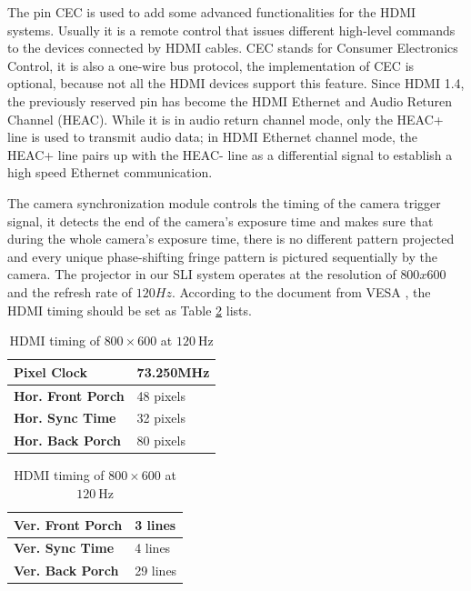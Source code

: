 \documentclass[]{spie}  %
\begin{document}
The pin CEC is used to add some advanced functionalities for the HDMI systems. Usually it is a remote control that issues different high-level commands to the devices connected by HDMI cables. CEC stands for Consumer Electronics Control, it is also a one-wire bus protocol, the implementation of CEC is optional, because not all the HDMI devices support this feature. Since HDMI 1.4, the previously reserved pin has become the HDMI Ethernet and Audio Returen Channel (HEAC). While it is in audio return channel mode, only the HEAC+ line is used to transmit audio data; in HDMI Ethernet channel mode, the HEAC+ line pairs up with the HEAC- line as a differential signal to establish a high speed Ethernet communication.

The camera synchronization module controls the timing of the camera trigger signal, it detects the end of the camera's exposure time and makes sure that during the whole camera's exposure time, there is no different pattern projected and every unique phase-shifting fringe pattern is pictured sequentially by the camera. The projector in our SLI system operates at the resolution of $800x600$ and the refresh rate of $120 Hz$. According to the document from VESA \cite{vesa07}, the HDMI timing should be set as Table \ref{Tab:2} lists.

\begin{table}[!b]
\caption{HDMI timing of $800\times 600$ at $120~\mbox{Hz}$}
\label{Tab:2}
\parbox{.45\linewidth}{
\centering
\begin{tabular}{|l|l|}
\hline
\textbf{Pixel Clock} & 73.250MHz \\ \hline
\textbf{Hor. Front Porch} & 48 pixels \\ \hline
\textbf{Hor. Sync Time} & 32 pixels \\ \hline
\textbf{Hor. Back Porch} & 80 pixels \\ \hline
\end{tabular}}
\hfill
\parbox{.45\linewidth}{
\centering
\begin{tabular}{|l|l|}
\hline
\textbf{Ver. Front Porch} & 3 lines \\ \hline
\textbf{Ver. Sync Time} & 4 lines \\ \hline
\textbf{Ver. Back Porch} & 29 lines \\ \hline
\end{tabular}
}\\
\end{table}
\end{document}
